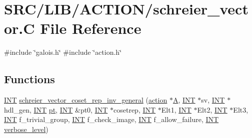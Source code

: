 \hypertarget{schreier__vector_8_c}{}\section{S\+R\+C/\+L\+I\+B/\+A\+C\+T\+I\+O\+N/schreier\+\_\+vector.C File Reference}
\label{schreier__vector_8_c}
{\ttfamily \#include \char`\"{}galois.\+h\char`\"{}}\newline
{\ttfamily \#include \char`\"{}action.\+h\char`\"{}}\newline
\subsection*{Functions}
\begin{DoxyCompactItemize}
\item 
\mbox{\hyperlink{galois_8h_a09fddde158a3a20bd2dcadb609de11dc}{I\+NT}} \mbox{\hyperlink{schreier__vector_8_c_a25359d4cb33dfdb9e98b06a69d60d680}{schreier\+\_\+vector\+\_\+coset\+\_\+rep\+\_\+inv\+\_\+general}} (\mbox{\hyperlink{classaction}{action}} $\ast$\mbox{\hyperlink{simeon_8_c_a97833f04c3a9c008df5521a2fc291bb4}{A}}, \mbox{\hyperlink{galois_8h_a09fddde158a3a20bd2dcadb609de11dc}{I\+NT}} $\ast$sv, \mbox{\hyperlink{galois_8h_a09fddde158a3a20bd2dcadb609de11dc}{I\+NT}} $\ast$hdl\+\_\+gen, \mbox{\hyperlink{galois_8h_a09fddde158a3a20bd2dcadb609de11dc}{I\+NT}} \mbox{\hyperlink{clique__finder_8_c_aec1f1a2b30fdca8844c2932384483145}{pt}}, \mbox{\hyperlink{galois_8h_a09fddde158a3a20bd2dcadb609de11dc}{I\+NT}} \&pt0, \mbox{\hyperlink{galois_8h_a09fddde158a3a20bd2dcadb609de11dc}{I\+NT}} $\ast$cosetrep, \mbox{\hyperlink{galois_8h_a09fddde158a3a20bd2dcadb609de11dc}{I\+NT}} $\ast$Elt1, \mbox{\hyperlink{galois_8h_a09fddde158a3a20bd2dcadb609de11dc}{I\+NT}} $\ast$Elt2, \mbox{\hyperlink{galois_8h_a09fddde158a3a20bd2dcadb609de11dc}{I\+NT}} $\ast$Elt3, \mbox{\hyperlink{galois_8h_a09fddde158a3a20bd2dcadb609de11dc}{I\+NT}} f\+\_\+trivial\+\_\+group, \mbox{\hyperlink{galois_8h_a09fddde158a3a20bd2dcadb609de11dc}{I\+NT}} f\+\_\+check\+\_\+image, \mbox{\hyperlink{galois_8h_a09fddde158a3a20bd2dcadb609de11dc}{I\+NT}} f\+\_\+allow\+\_\+failure, \mbox{\hyperlink{galois_8h_a09fddde158a3a20bd2dcadb609de11dc}{I\+NT}} \mbox{\hyperlink{simeon_8_c_a818073fbcc2f439e7c56952f67386122}{verbose\+\_\+level}})
\item 

\end{DoxyCompactItemize}
